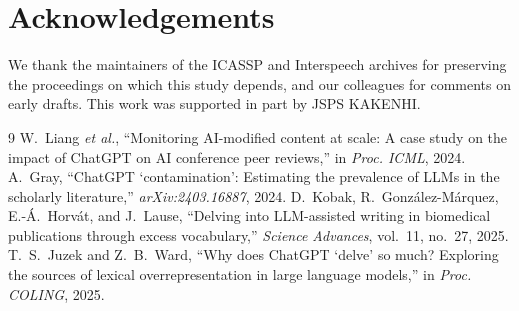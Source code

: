 \documentclass[a4paper,10pt,twocolumn]{article}
\begin{document}
\section{Acknowledgements}

We thank the maintainers of the ICASSP and Interspeech archives for preserving the proceedings on which this study depends, and our colleagues for comments on early drafts. This work was supported in part by JSPS KAKENHI.

\begin{thebibliography}{9}\small
{} W.~Liang \emph{et al.}, ``Monitoring AI-modified content at scale: A case study on the impact of ChatGPT on AI conference peer reviews,'' in \emph{Proc. ICML}, 2024.
 A.~Gray, ``ChatGPT `contamination': Estimating the prevalence of LLMs in the scholarly literature,'' \emph{arXiv:2403.16887}, 2024.
 D.~Kobak, R.~Gonz\'alez-M\'arquez, E.-\'A.~Horv\'at, and J.~Lause, ``Delving into LLM-assisted writing in biomedical publications through excess vocabulary,'' \emph{Science Advances}, vol.~11, no.~27, 2025.
 T.~S.~Juzek and Z.~B.~Ward, ``Why does ChatGPT `delve' so much? Exploring the sources of lexical overrepresentation in large language models,'' in \emph{Proc. COLING}, 2025.
\end{thebibliography}
\end{document}
